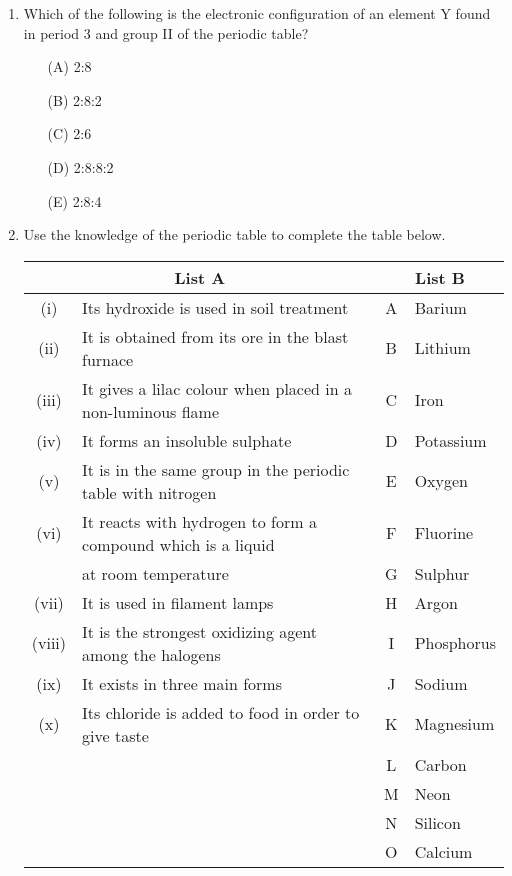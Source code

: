 \begin{enumerate}
	\item Which of the following is the electronic configuration of an element Y found in period 3 and group II of the periodic table?
	\begin{enumerate}[topsep=0ex,itemsep=0ex,partopsep=1ex,parsep=1ex]
		\item[(A)] 2:8
		\item[(B)] 2:8:2
		\item[(C)] 2:6
		\item[(D)] 2:8:8:2
		\item[(E)] 2:8:4
	\end{enumerate}

	\item Use the knowledge of the periodic table to complete the table below. 
	\begin{center}
		\begin{tabular}{|cp{9.5cm}|cp{2cm}|} \hline
			\multicolumn{2}{|c|}{List A} & \multicolumn{2}{|c|}{List B} \\ \hline
			(i) & Its hydroxide is used in soil treatment & A & Barium \\ 
			(ii) & It is obtained from its ore in the blast furnace & B & Lithium \\ 
			(iii) & It gives a lilac colour when placed in a non-luminous flame & C & Iron \\
			(iv) & It forms an insoluble sulphate & D & Potassium \\
			(v) & It is in the same group in the periodic table with nitrogen & E & Oxygen \\
			(vi) & It reacts with hydrogen to form a compound which is a liquid & F & Fluorine \\
			& at room temperature & G & Sulphur \\
			(vii) & It is used in filament lamps & H & Argon \\
			(viii) & It is the strongest oxidizing agent among the halogens & I & Phosphorus \\
			(ix) & It exists in three main forms & J & Sodium \\
			(x) & Its chloride is added to food in order to give taste & K & Magnesium \\
			& & L & Carbon \\
			& & M & Neon \\
			& & N & Silicon \\
			& & O & Calcium \\ \hline
		\end{tabular}
	\end{center}
	
\end{enumerate}












